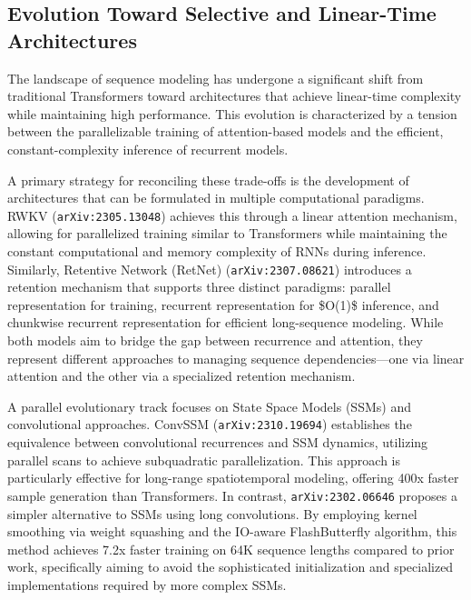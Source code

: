 \documentclass[11pt]{article}
\begin{document}
\subsection{Evolution Toward Selective and Linear-Time Architectures}

The landscape of sequence modeling has undergone a significant shift from traditional Transformers toward architectures that achieve linear-time complexity while maintaining high performance. This evolution is characterized by a tension between the parallelizable training of attention-based models and the efficient, constant-complexity inference of recurrent models.

A primary strategy for reconciling these trade-offs is the development of architectures that can be formulated in multiple computational paradigms. RWKV (\texttt{arXiv:2305.13048}) achieves this through a linear attention mechanism, allowing for parallelized training similar to Transformers while maintaining the constant computational and memory complexity of RNNs during inference. Similarly, Retentive Network (RetNet) (\texttt{arXiv:2307.08621}) introduces a retention mechanism that supports three distinct paradigms: parallel representation for training, recurrent representation for \$O(1)\$ inference, and chunkwise recurrent representation for efficient long-sequence modeling. While both models aim to bridge the gap between recurrence and attention, they represent different approaches to managing sequence dependencies—one via linear attention and the other via a specialized retention mechanism.

A parallel evolutionary track focuses on State Space Models (SSMs) and convolutional approaches. ConvSSM (\texttt{arXiv:2310.19694}) establishes the equivalence between convolutional recurrences and SSM dynamics, utilizing parallel scans to achieve subquadratic parallelization. This approach is particularly effective for long-range spatiotemporal modeling, offering 400x faster sample generation than Transformers. In contrast, \texttt{arXiv:2302.06646} proposes a simpler alternative to SSMs using long convolutions. By employing kernel smoothing via weight squashing and the IO-aware FlashButterfly algorithm, this method achieves 7.2x faster training on 64K sequence lengths compared to prior work, specifically aiming to avoid the sophisticated initialization and specialized implementations required by more complex SSMs.
\end{document}
